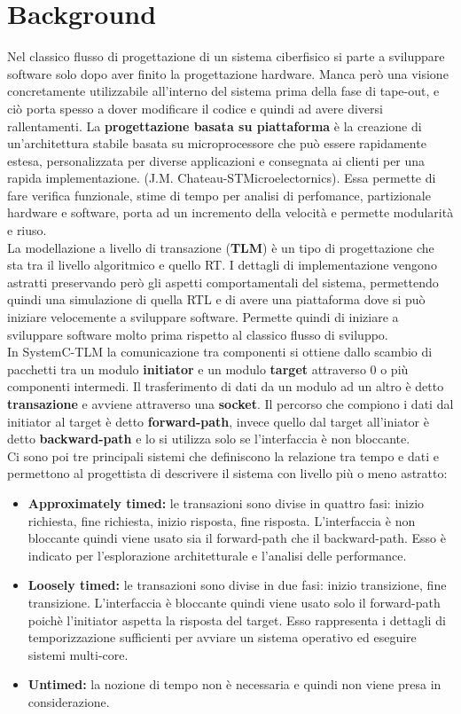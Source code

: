 \documentclass[]{IEEEtran}
\begin{document}
\section{Background}
Nel classico flusso di progettazione di un sistema ciberfisico si parte a sviluppare software solo dopo aver finito la progettazione hardware. Manca però una visione concretamente utilizzabile all'interno del sistema prima della fase di tape-out, e ciò porta spesso a dover modificare il codice e quindi ad avere diversi rallentamenti.
La \textbf{progettazione basata su piattaforma} è la creazione di un'architettura stabile basata su microprocessore che può essere rapidamente estesa, personalizzata per diverse applicazioni e consegnata ai clienti per una rapida implementazione. (J.M. Chateau-STMicroelectornics). Essa permette di fare verifica funzionale, stime di tempo per analisi di perfomance, partizionale hardware e software, porta ad un incremento della velocità e permette modularità e riuso.
\\La modellazione a livello di transazione (\textbf{TLM}) è un tipo di progettazione che sta tra il livello algoritmico e quello RT. I dettagli di implementazione vengono astratti preservando però gli aspetti comportamentali del sistema, permettendo quindi una simulazione di quella RTL e di avere una piattaforma dove si può iniziare velocemente a sviluppare software. Permette quindi di iniziare a sviluppare software molto prima rispetto al classico flusso di sviluppo.
\\In SystemC-TLM la comunicazione tra componenti si ottiene dallo scambio di pacchetti tra un modulo \textbf{initiator} e un modulo \textbf{target} attraverso 0 o più componenti intermedi. Il trasferimento di dati da un modulo ad un altro è detto \textbf{transazione} e avviene attraverso una \textbf{socket}. Il percorso che compiono i dati dal initiator al target è detto \textbf{forward-path}, invece quello dal target all'iniator è detto \textbf{backward-path} e lo si utilizza solo se l'interfaccia è non bloccante.
\\Ci sono poi tre principali sistemi che definiscono la relazione tra tempo e dati e permettono al progettista di descrivere il sistema con livello più o meno astratto:
\begin{itemize}
    \item \textbf{Approximately timed: } le transazioni sono divise in quattro fasi: inizio richiesta, fine richiesta, inizio risposta, fine risposta. L'interfaccia è non bloccante quindi viene usato sia il forward-path che il backward-path. Esso è indicato per l'esplorazione architetturale e l'analisi delle performance.
    \item \textbf{Loosely timed: } le transazioni sono divise in due fasi: inizio transizione, fine transizione. L'interfaccia è bloccante quindi viene usato solo il forward-path poichè l'initiator aspetta la risposta del target. Esso rappresenta i dettagli di temporizzazione sufficienti per avviare un sistema operativo ed eseguire sistemi multi-core.
    \item \textbf{Untimed: } la nozione di tempo non è necessaria e quindi non viene presa in considerazione.
\end{itemize}
\end{document}
